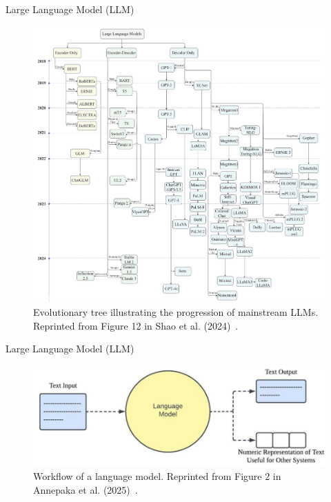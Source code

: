 \documentclass[12pt]{beamer}
\begin{document}
\begin{frame}[allowframebreaks]{Large Language Model (LLM)}
    \begin{figure}
        \centering
        \includegraphics[height=0.59\textheight]{figures/llm_evolution.png}
        \caption{Evolutionary tree illustrating the progression of mainstream LLMs. Reprinted from Figure 12 in Shao et al. (2024)~\cite{10720163}.}
        \label{fig:Fig. 5}
    \end{figure}
\end{frame}

\begin{frame}[allowframebreaks]{Large Language Model (LLM)}
    \begin{figure}
        \centering
        \includegraphics[width=0.9\linewidth]{figures/lm_workflow.png}
        \caption{Workflow of a language model. Reprinted from Figure 2 in Annepaka et al. (2025)~\cite{Annepaka2025}.}
        \label{fig:Fig. 6}
    \end{figure}
\end{frame} 
\end{document}
